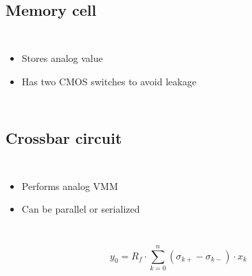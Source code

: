\documentclass[14pt]{beamer}
\begin{document}
  \subsection{Memory cell}

  \begin{frame}{\insertsection}{\insertsubsection}
    \begin{columns}
      
      \begin{itemize}
        \item Stores analog value
        \item Has two CMOS switches to avoid leakage
      \end{itemize}
    \end{columns}
  \end{frame}

  \begin{frame}{\insertsection}{\insertsubsection}
    \begin{center}
      
    \end{center}
  \end{frame}

  \subsection{Crossbar circuit}

  \begin{frame}{\insertsection}{\insertsubsection}
    \begin{columns}
      \begin{itemize}
        \item Performs analog VMM
        \item Can be parallel or serialized
      \end{itemize}
      
    \end{columns}
  \end{frame}

  \begin{frame}{\insertsection}{\insertsubsection}
    
    \begin{equation}
      \label{eq:doubleMem2}
      y_0=R_f\cdot\sum_{k=0}^n(\sigma_{k+}-\sigma_{k-})\cdot x_k
    \end{equation}
  \end{frame}
\end{document}
